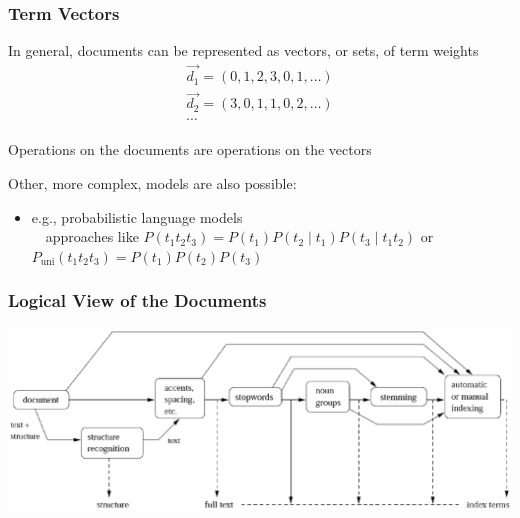 \documentclass[svgnames]{beamer}
\begin{document}
\begin{frame}
  \frametitle{Term Vectors}

  \begin{block}{}
    In general, documents can be represented as vectors, or sets, of term
      weights
      \begin{displaymath}
        \begin{array}{ll}
          \vec{d_1} = ( 0, 1, 2, 3, 0, 1, \ldots ) \\
          \vec{d_2} = ( 3, 0, 1, 1, 0, 2, \ldots ) \\
          \cdots
        \end{array}
      \end{displaymath}

    Operations on the documents are operations on the vectors
   
 \end{block}

\begin{block}{}
Other, more complex, models are also possible:
      \begin{itemize}
      \item e.g., probabilistic language models\\
      {\tiny
      ~~approaches like $P(t_{1}t_{2}t_{3})=P(t_{1})P(t_{2}\mid t_{1})P(t_{3}\mid t_{1}t_{2})$ or $P_{{\text{uni}}}(t_{1}t_{2}t_{3})=P(t_{1})P(t_{2})P(t_{3})$}
      \end{itemize}
\end{block}


\end{frame}


\begin{frame}
  \frametitle{Logical View of the Documents}

  \begin{block}{}
    \includegraphics[width=\textwidth]{logical}
  \end{block}  
  
\end{frame}
\end{document}
